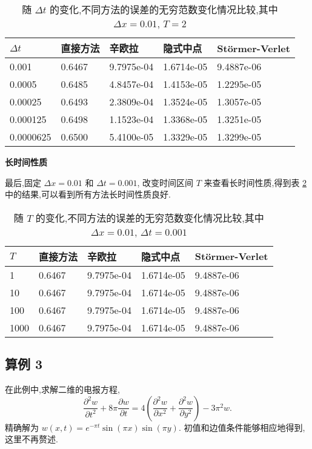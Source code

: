 \begin{table}[h]
  \centering
\caption{随 $\Delta t$ 的变化,不同方法的误差的无穷范数变化情况比较,其中 $\Delta x=0.01$, $T=2$}
\begin{tabularx}{\linewidth}{XXXXX}
 \toprule[1.5pt]
 $\Delta t$ &直接方法 & 辛欧拉 & 隐式中点 & St\"{o}rmer-Verlet\\
 \midrule[1pt]
 0.001 & 0.6467 & 9.7975e-04 & 1.6714e-05 & 9.4887e-06 \\
 0.0005 & 0.6485 & 4.8457e-04 & 1.4153e-05 & 1.2295e-05 \\
 0.00025 & 0.6493 & 2.3809e-04 & 1.3524e-05 & 1.3057e-05 \\
 0.000125 & 0.6498 & 1.1523e-04 & 1.3368e-05 & 1.3251e-05 \\
 0.0000625 & 0.6500 & 5.4100e-05 & 1.3329e-05 & 1.3299e-05 \\
 \bottomrule[1.5pt]
\end{tabularx}
  \label{tab:dt2}
\end{table}

\textbf{长时间性质}

最后,固定 $\Delta x = 0.01$ 和 $\Delta t = 0.001$, 改变时间区间 $T$ 来查看长时间性质,得到表 \ref{tab:t2} 中的结果,可以看到所有方法长时间性质良好.

\begin{table}[h]
  \centering
\caption{随 $T$ 的变化,不同方法的误差的无穷范数变化情况比较,其中 $\Delta x=0.01$, $\Delta t=0.001$}
\begin{tabularx}{\linewidth}{XXXXX}
 \toprule[1.5pt]
 $T$ &直接方法 & 辛欧拉 & 隐式中点 & St\"{o}rmer-Verlet\\
 \midrule[1pt]
 1 & 0.6467 & 9.7975e-04 & 1.6714e-05 & 9.4887e-06 \\
 10 & 0.6467 & 9.7975e-04 & 1.6714e-05 & 9.4887e-06 \\
 100 & 0.6467 & 9.7975e-04 & 1.6714e-05 & 9.4887e-06 \\
 1000 & 0.6467 & 9.7975e-04 & 1.6714e-05 & 9.4887e-06 \\
 \bottomrule[1.5pt]
\end{tabularx}
  \label{tab:t2}
\end{table}

\subsection*{算例 3}
在此例中,求解二维的电报方程,
\begin{equation*}
\frac{\partial ^2 w}{\partial t^2}+8\pi \frac{\partial w}{\partial
t}=4 (\frac{\partial ^2 w}{\partial x^2} + \frac{\partial ^2
w}{\partial y^2}) -3\pi^2 w.
\end{equation*}
精确解为 $w(x,t) = e^{-\pi t}\sin(\pi x)\sin(\pi y)$. 初值和边值条件能够相应地得到,这里不再赘述.


